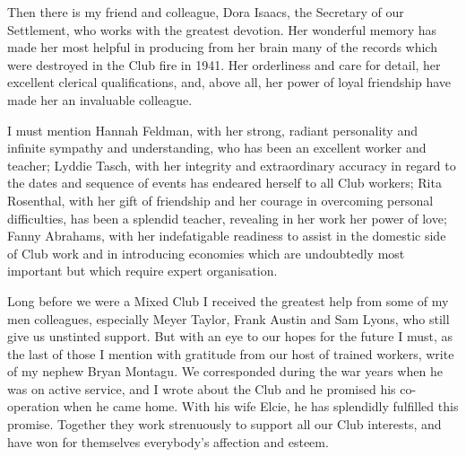 Then there is my friend and colleague, Dora Isaacs,
the Secretary of our Settlement, who works with the
greatest devotion. Her wonderful memory has made her
most helpful in producing from her brain many of the
records which were destroyed in the Club fire in 1941.
Her orderliness and care for detail, her excellent clerical
qualifications, and, above all, her power of loyal friendship
have made her an invaluable colleague.

I must mention Hannah Feldman, with her strong,
radiant personality and infinite sympathy and understanding,
who has been an excellent worker and teacher;
Lyddie Tasch, with her integrity and extraordinary
accuracy in regard to the dates and sequence of events
has endeared herself to all Club workers; Rita Rosenthal,
with her gift of friendship and her courage in overcoming
personal difficulties, has been a splendid teacher,
revealing in her work her power of love; Fanny
Abrahams, with her indefatigable readiness to assist in
the domestic side of Club work and in introducing
economies which are undoubtedly most important but
which require expert organisation.

Long before we were a Mixed Club I received the
greatest help from some of my men colleagues, especially
Meyer Taylor, Frank Austin and Sam Lyons, who still
give us unstinted support. But with an eye to our hopes
for the future I must, as the last of those I mention with
gratitude from our host of trained workers, write of my
nephew Bryan Montagu. We corresponded during the
war years when he was on active service, and I wrote
about the Club and he promised his co-operation when
he came home. With his wife Elcie, he has splendidly
fulfilled this promise. Together they work strenuously
to support all our Club interests, and have won for
themselves everybody’s affection and esteem.

